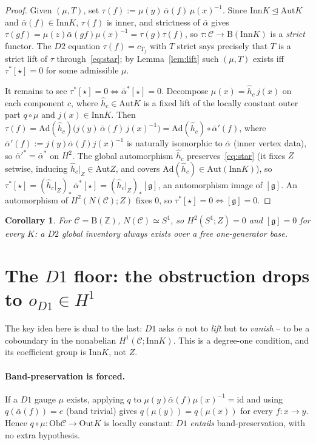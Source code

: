 \documentclass[11pt]{article}
\newtheorem{corollary}[theorem]{Corollary}
\theoremstyle{definition}
\newcommand{\C}{\mathcal{C}}
\newcommand{\Ob}{\mathrm{Ob}}
\newcommand{\id}{\mathrm{id}}
\newcommand{\Z}{\mathbb{Z}}
\newcommand{\Aut}{\mathrm{Aut}}
\newcommand{\Inn}{\mathrm{Inn}}
\newcommand{\Out}{\mathrm{Out}}
\newcommand{\gerbe}{\mathfrak{g}}
\newcommand{\abar}{\bar{\alpha}}
\newcommand{\B}{\mathrm{B}}
\newcommand{\Ad}{\mathrm{Ad}}
\begin{document}
\begin{proof}
Given $(\mu,T)$, set $\tau(f):=\mu(y)\,\abar(f)\,\mu(x)^{-1}$. Since $\Inn K\trianglelefteq
\Aut K$ and $\abar(f)\in\Inn K$, $\tau(f)$ is inner, and strictness of $\abar$ gives
$\tau(gf)=\mu(z)\abar(gf)\mu(x)^{-1}=\tau(g)\tau(f)$, so $\tau\colon\C\to\B(\Inn K)$ is a
\emph{strict} functor. The $D2$ equation $\tau(f)=c_{T_f}$ with $T$ strict says precisely
that $T$ is a strict lift of $\tau$ through~\eqref{eq:star}; by Lemma~\ref{lem:lift} such
$(\mu,T)$ exists iff $\tau^{*}[\star]=0$ for some admissible $\mu$.

It remains to see $\tau^{*}[\star]=0\iff\abar^{*}[\star]=0$. Decompose $\mu(x)=\hat h_c\,j(x)$
on each component $c$, where $\hat h_c\in\Aut K$ is a fixed lift of the locally constant
outer part $q\circ\mu$ and $j(x)\in\Inn K$. Then
$\tau(f)=\Ad(\hat h_c)\big(j(y)\,\abar(f)\,j(x)^{-1}\big)=\Ad(\hat h_c)\circ\abar'(f)$, where
$\abar'(f):=j(y)\abar(f)j(x)^{-1}$ is naturally isomorphic to $\abar$ (inner vertex data), so
$\abar'^{*}=\abar^{*}$ on $H^2$. The global automorphism $\hat h_c$ preserves~\eqref{eq:star}
(it fixes $Z$ setwise, inducing $\hat h_c|_Z\in\Aut Z$, and covers $\Ad(\hat h_c)\in\Aut(\Inn
K)$), so $\tau^{*}[\star]=(\hat h_c|_Z)_{*}\,\abar^{*}[\star]=(\hat h_c|_Z)_{*}[\gerbe]$, an
automorphism image of $[\gerbe]$. An automorphism of $H^2(N(\C);Z)$ fixes $0$, so
$\tau^{*}[\star]=0\iff[\gerbe]=0$.
\end{proof}

\begin{corollary}\label{cor:bz}
For $\C=\B(\Z)$, $N(\C)\simeq S^1$, so $H^2(S^1;Z)=0$ and $[\gerbe]=0$ for every $K$: a $D2$
global inventory always exists over a free one-generator base.
\end{corollary}

\section{The $D1$ floor: the obstruction drops to $o_{D1}\in H^1$}\label{sec:d1}

The key idea here is dual to the last: $D1$ asks $\abar$ not to \emph{lift} but to
\emph{vanish} -- to be a coboundary in the nonabelian $H^1(\C;\Inn K)$. This is a
degree-one condition, and its coefficient group is $\Inn K$, not $Z$.

\paragraph{Band-preservation is forced.} If a $D1$ gauge $\mu$ exists, applying $q$ to
$\mu(y)\abar(f)\mu(x)^{-1}=\id$ and using $q(\abar(f))=e$ (band trivial) gives
$q(\mu(y))=q(\mu(x))$ for every $f\colon x\to y$. Hence $q\circ\mu\colon\Ob\C\to\Out K$ is
locally constant: $D1$ \emph{entails} band-preservation, with no extra hypothesis.
\end{document}
